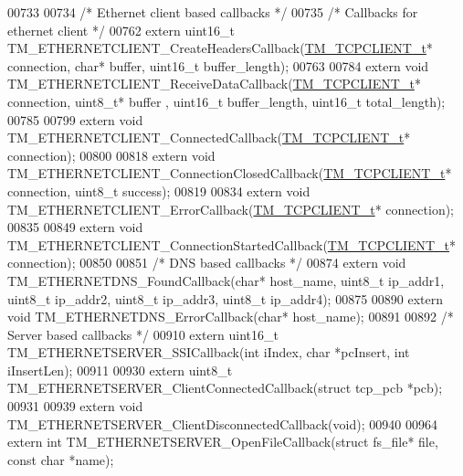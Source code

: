 \begin{DoxyCode}
00733 
00734 \textcolor{comment}{/* Ethernet client based callbacks */}
00735 \textcolor{comment}{/* Callbacks for ethernet client */}
00762 \textcolor{keyword}{extern} uint16\_t TM\_ETHERNETCLIENT\_CreateHeadersCallback(\hyperlink{struct_t_m___t_c_p_c_l_i_e_n_t__t}{TM\_TCPCLIENT\_t}* connection, \textcolor{keywordtype}{char}* 
      buffer, uint16\_t buffer\_length);
00763 
00784 \textcolor{keyword}{extern} \textcolor{keywordtype}{void} TM\_ETHERNETCLIENT\_ReceiveDataCallback(\hyperlink{struct_t_m___t_c_p_c_l_i_e_n_t__t}{TM\_TCPCLIENT\_t}* connection, uint8\_t* buffer
      , uint16\_t buffer\_length, uint16\_t total\_length);
00785 
00799 \textcolor{keyword}{extern} \textcolor{keywordtype}{void} TM\_ETHERNETCLIENT\_ConnectedCallback(\hyperlink{struct_t_m___t_c_p_c_l_i_e_n_t__t}{TM\_TCPCLIENT\_t}* connection);
00800 
00818 \textcolor{keyword}{extern} \textcolor{keywordtype}{void} TM\_ETHERNETCLIENT\_ConnectionClosedCallback(\hyperlink{struct_t_m___t_c_p_c_l_i_e_n_t__t}{TM\_TCPCLIENT\_t}* connection, uint8\_t 
      success);
00819 
00834 \textcolor{keyword}{extern} \textcolor{keywordtype}{void} TM\_ETHERNETCLIENT\_ErrorCallback(\hyperlink{struct_t_m___t_c_p_c_l_i_e_n_t__t}{TM\_TCPCLIENT\_t}* connection);
00835 
00849 \textcolor{keyword}{extern} \textcolor{keywordtype}{void} TM\_ETHERNETCLIENT\_ConnectionStartedCallback(\hyperlink{struct_t_m___t_c_p_c_l_i_e_n_t__t}{TM\_TCPCLIENT\_t}* connection);
00850 
00851 \textcolor{comment}{/* DNS based callbacks */}
00874 \textcolor{keyword}{extern} \textcolor{keywordtype}{void} TM\_ETHERNETDNS\_FoundCallback(\textcolor{keywordtype}{char}* host\_name, uint8\_t ip\_addr1, uint8\_t ip\_addr2, uint8\_t 
      ip\_addr3, uint8\_t ip\_addr4);
00875 
00890 \textcolor{keyword}{extern} \textcolor{keywordtype}{void} TM\_ETHERNETDNS\_ErrorCallback(\textcolor{keywordtype}{char}* host\_name);
00891 
00892 \textcolor{comment}{/* Server based callbacks */}
00910 \textcolor{keyword}{extern} uint16\_t TM\_ETHERNETSERVER\_SSICallback(\textcolor{keywordtype}{int} iIndex, \textcolor{keywordtype}{char} *pcInsert, \textcolor{keywordtype}{int} iInsertLen);
00911 
00930 \textcolor{keyword}{extern} uint8\_t TM\_ETHERNETSERVER\_ClientConnectedCallback(\textcolor{keyword}{struct} tcp\_pcb *pcb);
00931 
00939 \textcolor{keyword}{extern} \textcolor{keywordtype}{void} TM\_ETHERNETSERVER\_ClientDisconnectedCallback(\textcolor{keywordtype}{void});
00940 
00964 \textcolor{keyword}{extern} \textcolor{keywordtype}{int} TM\_ETHERNETSERVER\_OpenFileCallback(\textcolor{keyword}{struct} fs\_file* file, \textcolor{keyword}{const} \textcolor{keywordtype}{char} *name);

\end{DoxyCode}

